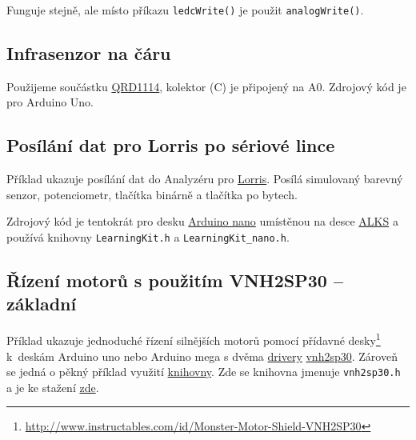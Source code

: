 
 
Funguje stejně, ale místo příkazu {\tt ledcWrite()} je použit {\tt analogWrite()}.

\subsection{Infrasenzor na čáru} \label{prog:qrd1114}

Použijeme součástku \hyperref[qrd1114]{QRD1114}, kolektor (C) je připojený na A0. Zdrojový kód je pro Arduino Uno. 



\subsection{Posílání dat pro Lorris po sériové lince} \label{prog:lorris}

Příklad ukazuje posílání dat do Analyzéru pro \hyperref[lorris]{Lorris}.
 Posílá simulovaný barevný senzor, potenciometr, tlačítka binárně a tlačítka po bytech. 

Zdrojový kód je tentokrát pro desku \hyperref[alks:nano]{Arduino nano}
 umístěnou na desce \hyperref[alks]{ALKS} a používá knihovny
{\tt LearningKit.h}  a  {\tt LearningKit\_nano.h}. 



\label{prog:vnh2sp30} \label{prog:knihovna} 
\subsection{Řízení motorů s použitím VNH2SP30 -- základní} 

Příklad ukazuje jednoduché řízení silnějších motorů pomocí přídavné 
desky\footnote{\url{http://www.instructables.com/id/Monster-Motor-Shield-VNH2SP30}
	} k~deskám Arduino uno nebo Arduino mega  s dvěma \hyperref[driver]{drivery}
  \hyperref[vnh2sp30]{vnh2sp30}.  Zároveň se jedná o pěkný příklad využití \hyperref[knihovna]{knihovny}. Zde se knihovna jmenuje {\tt vnh2sp30.h} a je ke stažení 
  \href{https://github.com/RoboticsBrno/RoboticsBrno-guides/tree/RoboticsManual/RoboticsManual/priklady_c}{zde}.







